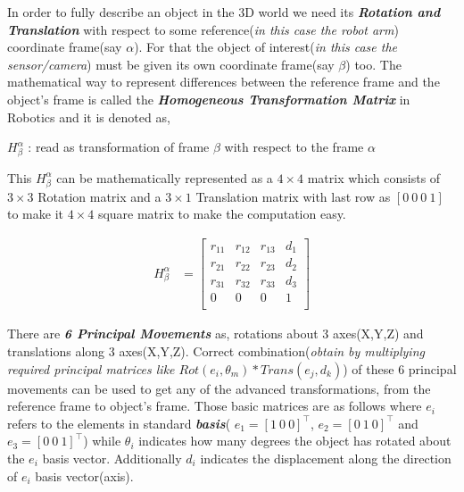 \documentclass[a4paper,11pt]{article}%
\begin{document}
In order to fully describe an object in the 3D world we need its \textit{\textbf{Rotation and Translation}} with respect to some reference(\textit{in this case the robot arm}) coordinate frame(say $\alpha$). For that the object of interest(\textit{in this case the sensor/camera}) must be given its own coordinate frame(say $\beta$) too. The mathematical way to represent differences between the reference frame and the object's frame is called the \textbf{\textit{Homogeneous Transformation Matrix}}\cite{robotic} in Robotics and it is denoted as,

\begin{center}
	$ H^{\alpha}_{\beta} $ : read as transformation of frame $\beta$ with respect to the frame $\alpha$
\end{center}

This 	$ H^{\alpha}_{\beta} $ can be mathematically represented as a $4 \times 4$ matrix which consists of $3 \times 3$ Rotation matrix and a $3 \times 1$ Translation matrix with last row as $[0~0~0~1]$ to make it  $4 \times 4$ square matrix to make the computation easy.

\begin{equation}
	\begin{split}
		 H^{\alpha}_{\beta} &=
			\begin{bmatrix}
				 r_{11} & r_{12} & r_{13} & d_1 \\
				 r_{21} & r_{22} & r_{23} & d_2 \\
				 r_{31} & r_{32} & r_{33} & d_3 \\
				 0 & 0 & 0 &1 \\
			\end{bmatrix}
	\end{split}
\end{equation}

There are  \textbf{\textit{6 Principal Movements}} as, rotations about 3 axes(X,Y,Z) and translations along 3 axes(X,Y,Z). Correct combination(\textit{obtain by multiplying required principal matrices like $Rot(e_i,\theta_m)*Trans(e_j,d_k)$}) of these 6 principal movements  can be used to get any of the advanced transformations, from the reference frame to object's frame. Those basic matrices are as follows where $e_i$ refers to the elements in standard \textbf{\textit{basis}}( $e_1 = [1 ~0~ 0]^\top$, $e_2 = [0 ~1~ 0]^\top$ and $e_3 = [0 ~0~ 1]^\top$) while $\theta_i$ indicates how many degrees the object has rotated about the $e_i$ basis vector. Additionally $d_i$ indicates the displacement along the direction of $e_i$ basis vector(axis)\cite{tfs1}. \\
\end{document}
